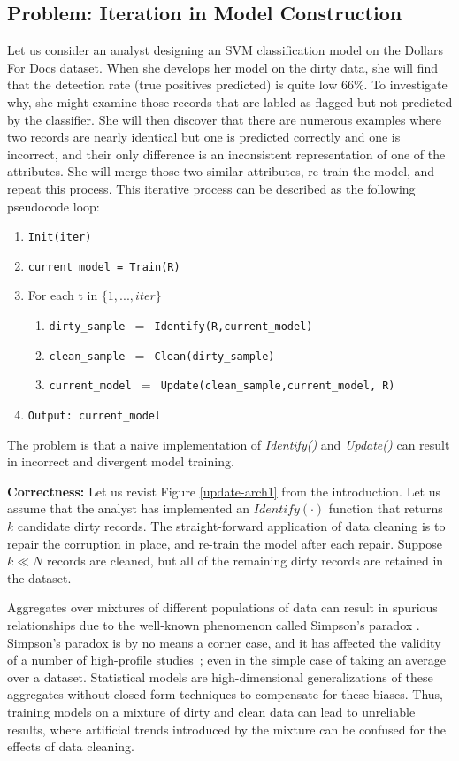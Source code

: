 \subsection{Problem: Iteration in Model Construction}
Let us consider an analyst designing an SVM classification model on the Dollars For Docs dataset.
When she develops her model on the dirty data, she will find that the detection rate (true positives predicted) is quite low 66\%.
To investigate why, she might examine those records that are labled as flagged but not predicted by the classifier.
She will then discover that there are numerous examples where two records are nearly identical but one is predicted correctly and one is incorrect, and their only difference is an inconsistent representation of one of the attributes.
She will merge those two similar attributes, re-train the model, and repeat this process.
This iterative process can be described as the following pseudocode loop:
\begin{enumerate}[leftmargin=1em]\scriptsize\sloppy
  \item \texttt{Init(iter)}
  \item \texttt{current\_model = Train(R)}
  \item For each t in $\{1,...,iter\}$
  \begin{enumerate}
    \item \texttt{dirty\_sample $=$ Identify(R,current\_model)}
    \item \texttt{clean\_sample $=$ Clean(dirty\_sample)}
    \item \texttt{current\_model $=$ Update(clean\_sample,current\_model, R)}
  \end{enumerate}
  \item \texttt{Output: current\_model}
  \end{enumerate}
The problem is that a naive implementation of \emph{Identify()} and \emph{Update()} can result in incorrect and divergent model training.

\vspace{0.5em}
\textbf{Correctness: } Let us revist Figure \ref{update-arch1} from the introduction. Let us assume that the analyst has implemented an $Identify(\cdot)$ function that returns $k$ candidate dirty records.
The straight-forward application of data cleaning is to repair the corruption in place, and re-train the model after each repair.
Suppose $k \ll N$ records are cleaned, but all of the remaining dirty records are retained in the dataset.

Aggregates over mixtures of different populations of data can result in spurious relationships due to the well-known phenomenon called Simpson's paradox \cite{simpson1951interpretation}.
Simpson's paradox is by no means a corner case, and it has affected the validity of a number of high-profile studies~\cite{simpsonsparadox}; even in the simple case of taking an average over a dataset.
Statistical models are high-dimensional generalizations of these aggregates without closed form techniques to compensate for these biases.
Thus, training models on a mixture of dirty and clean data can lead to unreliable results, where artificial trends introduced by the mixture can be confused for the effects of data cleaning.

